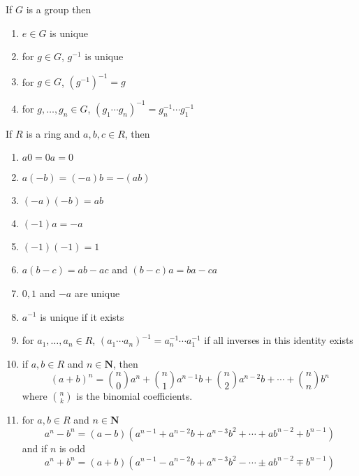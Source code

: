 \documentclass[11pt]{book}
\newcommand{\env}[2]{\begin{#1}#2\end{#1}}
\begin{document}
\begin{proposition}
If $G$ is a group then 
\env{enumerate}{
	\item $e\in G$ is unique
	\item for $g\in G$, $g^{-1}$ is unique
	\item for $g\in G$, $(g^{-1})^{-1}=g$
	\item for $g,\dots,g_n\in G$, $(g_1\cdots g_n)^{-1}=g_n^{-1}\cdots g_1^{-1}$
}
\end{proposition}
\begin{proposition}
If $R$ is a ring and $a,b,c\in R$, then
\env{enumerate}{
	\item $a0=0a=0$
	\item $a(-b)=(-a)b=-(ab)$
	\item $(-a)(-b)=ab$
	\item $(-1)a=-a$
	\item $(-1)(-1)=1$
	\item $a(b-c)=ab-ac$ and $(b-c)a=ba-ca$
	\item $0,1$ and $-a$ are unique
	\item $a^{-1}$ is unique if it exists
	\item for $a_1,\dots,a_n\in R$, $(a_1\cdots a_n)^{-1}=a_n^{-1}\cdots a_1^{-1}$ if all inverses in this identity exists
	\item if $a,b\in R$ and $n\in \mathbf{N}$, then
	\[(a+b)^n=\binom{n}{0}a^n+\binom{n}{1}a^{n-1}b+\binom{n}{2}a^{n-2}b+\cdots+\binom{n}{n}b^n\]
	where $\binom{n}{k}$ is the binomial coefficients.
	\item for $a,b\in R$ and $n\in\mathbf{N}$
	\[a^n-b^n=(a-b)(a^{n-1}+a^{n-2}b+a^{n-3}b^2+\cdots +ab^{n-2}+b^{n-1})\]
	and if $n$ is odd
	\[a^n+b^n=(a+b)(a^{n-1}-a^{n-2}b+a^{n-3}b^2-\cdots \pm ab^{n-2}\mp b^{n-1})\]
}
\end{proposition}
\end{document}
